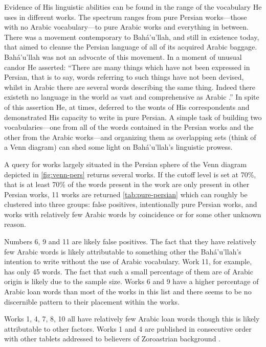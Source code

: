 \documentclass[12pt, oneside]{report}
\begin{document}
\par
Evidence of His linguistic abilities can be found in the range of the vocabulary He uses in different works.
The spectrum ranges from pure Persian works---those with no Arabic vocabulary---to pure Arabic works and everything in between.
There was a movement contemporary to Bah\'{a}'u'llah, and still in existence today, that aimed to cleanse the Persian language of all of its acquired Arabic baggage.
Bah\'{a}'u'llah was not an advocate of this movement.
In a moment of unusual candor He asserted: ``There are many things which have not been expressed in Persian, that is to say, words referring to such things have not been devised, whilst in Arabic there are several words describing the same thing. Indeed there existeth no language in the world as vast and comprehensive as Arabic \cite{bahaullah_tabernacle_2006}.''
In spite of this assertion He, at times, deferred to the wonts of His correspondents and demonstrated His capacity to write in pure Persian.
A simple task of building two vocabularies---one from all of the words contained in the Persian works and the other from the Arabic works---and organizing them as overlapping sets (think of a Venn diagram) can shed some light on Bah\'{a}'u'llah's linguistic prowess.
\par
A query for works largely situated in the Persian sphere of the Venn diagram depicted in \autoref{fig:venn-pers} returns several works.
If the cutoff level is set at 70\%, that is at least 70\% of the words present in the work are only present in other Persian works, 11 works are returned \ref{tab:pure-persian} which can roughly be clustered into three groups: false positives, intentionally pure Persian works, and works with relatively few Arabic words by coincidence or for some other unknown reason.
\par
Numbers 6, 9 and 11 are likely false positives.
The fact that they have relatively few Arabic words is likely attributable to something other the Bah\'{a}'u'llah's intention to write without the use of Arabic vocabulary.
Work 11, for example, has only 45 words.
The fact that such a small percentage of them are of Arabic origin is likely due to the sample size.
Works 6 and 9 have a higher percentage of Arabic loan words than most of the works in this list and there seems to be no discernible pattern to their placement within the works.
\par
Works 1, 4, 7, 8, 10 all have relatively few Arabic loan words though this is likely attributable to other factors.
Works 1 and 4 are published in consecutive order with other tablets addressed to believers of Zoroastrian background \cite{bahaullah_majmu`ih-i_1920}.
\end{document}
